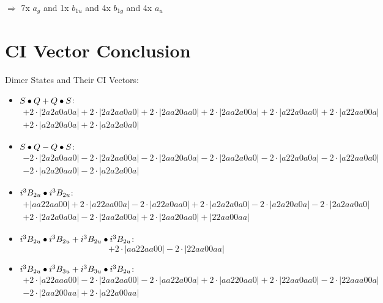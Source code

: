 \documentclass{article}
\begin{document}
$\Rightarrow{}$ 7x $a_{g}$ and 1x $b_{1u}$ and 4x $b_{1g}$ and 4x $a_{u}$


\newpage
\section{CI Vector Conclusion} 
Dimer States and Their CI Vectors:
\begin{itemize}
\item \boldmath$S \bullet Q + Q \bullet S \displaystyle $\unboldmath : \quad$$\begin{array}{c}
+2 \cdot \left|2a2a0a0a\right| +2 \cdot \left|2a2aa0a0\right| +2 \cdot \left|2aa20aa0\right| +2 \cdot \left|2aa2a00a\right| +2 \cdot \left|a22a0aa0\right| +2 \cdot \left|a22aa00a\right| \\[0.5cm] +2 \cdot \left|a2a20a0a\right| +2 \cdot \left|a2a2a0a0\right|
\end{array}$$
\item \boldmath$S \bullet Q - Q \bullet S \displaystyle $\unboldmath : \quad$$\begin{array}{c}
-2 \cdot \left|2a2a0aa0\right| -2 \cdot \left|2a2aa00a\right| -2 \cdot \left|2aa20a0a\right| -2 \cdot \left|2aa2a0a0\right| -2 \cdot \left|a22a0a0a\right| -2 \cdot \left|a22aa0a0\right| \\[0.5cm] -2 \cdot \left|a2a20aa0\right| -2 \cdot \left|a2a2a00a\right|
\end{array}$$
\item \boldmath$i^3 B_{2u} \bullet i^3 B_{2u} \displaystyle $\unboldmath : \quad$$\begin{array}{c}
+\left|aa22aa00\right| +2 \cdot \left|a22aa00a\right| -2 \cdot \left|a22a0aa0\right| +2 \cdot \left|a2a2a0a0\right| -2 \cdot \left|a2a20a0a\right| -2 \cdot \left|2a2aa0a0\right| \\[0.5cm] +2 \cdot \left|2a2a0a0a\right| -2 \cdot \left|2aa2a00a\right| +2 \cdot \left|2aa20aa0\right| +\left|22aa00aa\right|
\end{array}$$
\item \boldmath$i^3 B_{2u} \bullet i^3 B_{2u} + i^3 B_{2u} \bullet i^3 B_{2u} \displaystyle $\unboldmath : \quad$$+2 \cdot \left|aa22aa00\right| -2 \cdot \left|22aa00aa\right|$$
\item \boldmath$i^3 B_{2u} \bullet i^3 B_{3u} + i^3 B_{3u} \bullet i^3 B_{2u} \displaystyle $\unboldmath : \quad$$\begin{array}{c}
+2 \cdot \left|a22aaa00\right| -2 \cdot \left|2aa2aa00\right| -2 \cdot \left|aa22a00a\right| +2 \cdot \left|aa220aa0\right| +2 \cdot \left|22aa0aa0\right| -2 \cdot \left|22aaa00a\right| \\[0.5cm] -2 \cdot \left|2aa200aa\right| +2 \cdot \left|a22a00aa\right|

\end{array}$$
\end{itemize}
\end{document}
